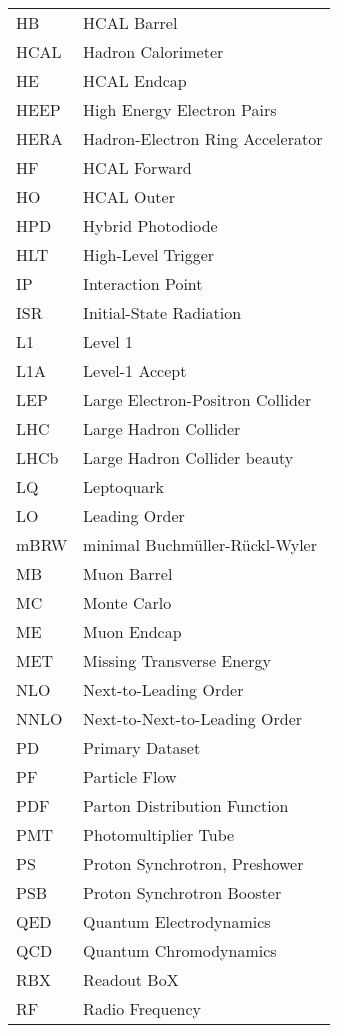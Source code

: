 \begin{supertabular}[l]{@{}l@{\ \ \ \ \ \ \ \ \ \ \ \ }l}
HB         & HCAL Barrel \\
HCAL       & Hadron Calorimeter \\
HE         & HCAL Endcap \\
HEEP       & High Energy Electron Pairs \\
HERA       & Hadron-Electron Ring Accelerator \\
HF         & HCAL Forward \\
HO         & HCAL Outer \\
HPD        & Hybrid Photodiode \\
HLT        & High-Level Trigger \\
IP         & Interaction Point \\
ISR        & Initial-State Radiation \\
L1         & Level 1 \\
L1A        & Level-1 Accept \\
LEP        & Large Electron-Positron Collider \\
LHC        & Large Hadron Collider \\
LHCb       & Large Hadron Collider beauty \\
LQ         & Leptoquark \\
LO         & Leading Order \\
mBRW       & minimal Buchm\"{u}ller-R\"{u}ckl-Wyler \\
MB         & Muon Barrel \\
MC         & Monte Carlo \\
ME         & Muon Endcap \\
MET        & Missing Transverse Energy \\
NLO        & Next-to-Leading Order \\
NNLO       & Next-to-Next-to-Leading Order \\
PD         & Primary Dataset \\
PF         & Particle Flow \\
PDF        & Parton Distribution Function \\
PMT        & Photomultiplier Tube \\
PS         & Proton Synchrotron, Preshower \\
PSB        & Proton Synchrotron Booster \\
QED        & Quantum Electrodynamics \\
QCD        & Quantum Chromodynamics \\
RBX        & Readout BoX \\
RF         & Radio Frequency \\

\end{supertabular}
